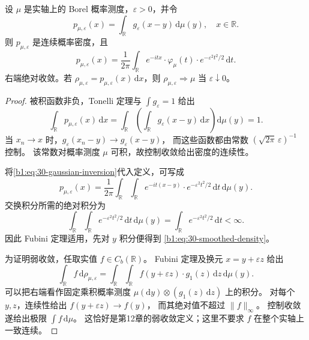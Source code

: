 \begin{lemma}\label{b1:lem:30-gaussian-smoothing}
设 \(\mu\) 是实轴上的 Borel 概率测度，\(\varepsilon>0\)，并令
\[
 p_{\mu,\varepsilon}(x)
   =\int_{\mathbb R}g_\varepsilon(x-y)\,\mathrm d\mu(y),
 \quad x\in\mathbb R.
\]
则 \(p_{\mu,\varepsilon}\) 是连续概率密度，且
\begin{equation}\label{b1:eq:30-smoothed-density}
 p_{\mu,\varepsilon}(x)
 =\frac{1}{2\pi}\int_{\mathbb R}
       e^{-itx}\cdot\varphi_\mu(t)\cdot e^{-\varepsilon^2t^2/2}\,\mathrm dt.
\end{equation}
右端绝对收敛。若
\(\rho_{\mu,\varepsilon}=p_{\mu,\varepsilon}(x)\,\mathrm dx\)，则
\(\rho_{\mu,\varepsilon}\Rightarrow\mu\) 当 \(\varepsilon\downarrow0\)。
\end{lemma}
\begin{proof}
被积函数非负，Tonelli 定理与 \(\int g_\varepsilon=1\) 给出
\[
 \int_{\mathbb R}p_{\mu,\varepsilon}(x)\,\mathrm dx
 =\int_{\mathbb R}\left(\int_{\mathbb R}
       g_\varepsilon(x-y)\,\mathrm dx\right)\mathrm d\mu(y)
 =1.
\]
当 \(x_n\to x\) 时，\(g_\varepsilon(x_n-y)\to g_\varepsilon(x-y)\)，
而这些函数都由常数 \((\sqrt{2\pi}\,\varepsilon)^{-1}\) 控制。
该常数对概率测度 \(\mu\) 可积，故控制收敛给出密度的连续性。

将\eqref{b1:eq:30-gaussian-inversion}代入定义，可写成
\[
 p_{\mu,\varepsilon}(x)
 =\frac{1}{2\pi}\int_{\mathbb R}\int_{\mathbb R}
       e^{-it(x-y)}\cdot e^{-\varepsilon^2t^2/2}
       \,\mathrm dt\,\mathrm d\mu(y).
\]
交换积分所需的绝对积分为
\[
 \int_{\mathbb R}\int_{\mathbb R}
       e^{-\varepsilon^2t^2/2}\,\mathrm dt\,\mathrm d\mu(y)
 =\int_{\mathbb R}e^{-\varepsilon^2t^2/2}\,\mathrm dt<\infty.
\]
因此 Fubini 定理适用，先对 \(y\) 积分便得到
\eqref{b1:eq:30-smoothed-density}。

为证明弱收敛，任取实值 \(f\in C_b(\mathbb R)\)。
Fubini 定理及换元 \(x=y+\varepsilon z\) 给出
\[
 \int_{\mathbb R}f\,\mathrm d\rho_{\mu,\varepsilon}
 =\int_{\mathbb R}\int_{\mathbb R}
       f(y+\varepsilon z)\cdot g_1(z)\,\mathrm dz\,\mathrm d\mu(y).
\]
可以把右端看作固定乘积概率测度
\(\mu(\mathrm dy)\otimes(g_1(z)\,\mathrm dz)\) 上的积分。
对每个 \(y,z\)，连续性给出 \(f(y+\varepsilon z)\to f(y)\)，
而其绝对值不超过 \(\|f\|_\infty\)。
控制收敛遂给出极限 \(\int f\,\mathrm d\mu\)。
这恰好是第12章的弱收敛定义；这里不要求 \(f\) 在整个实轴上一致连续。
\end{proof}

